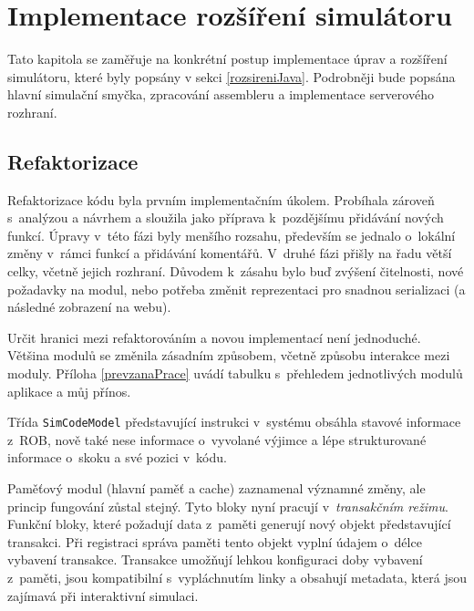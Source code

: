 
\chapter{Implementace rozšíření simulátoru}
\label{Implementacerozs}

Tato kapitola se zaměřuje na konkrétní postup implementace úprav a rozšíření simulátoru, které byly popsány v sekci \ref{rozsireniJava}.
Podrobněji bude popsána hlavní simulační smyčka, zpracování assembleru a implementace serverového rozhraní.

\section{Refaktorizace}

Refaktorizace kódu byla prvním implementačním úkolem.
Probíhala zároveň s~analýzou a návrhem a sloužila jako příprava k~pozdějšímu přidávání nových funkcí.
Úpravy v~této fázi byly menšího rozsahu, především se jednalo o~lokální změny v~rámci funkcí a přidávání komentářů.
V~druhé fázi přišly na řadu větší celky, včetně jejich rozhraní.
Důvodem k~zásahu bylo buď zvýšení čitelnosti, nové požadavky na modul, nebo potřeba změnit reprezentaci pro snadnou serializaci (a následné zobrazení na webu).

Určit hranici mezi refaktorováním a novou implementací není jednoduché.
Většina modulů se změnila zásadním způsobem, včetně způsobu interakce mezi moduly.
Příloha \ref{prevzanaPrace} uvádí tabulku s~přehledem jednotlivých modulů aplikace a můj přínos.

Třída \texttt{SimCodeModel} představující instrukci v~systému obsáhla stavové informace z~ROB, nově také nese informace o~vyvolané výjimce a lépe strukturované informace o~skoku a své pozici v~kódu.

Paměťový modul (hlavní paměť a cache) zaznamenal významné změny, ale princip fungování zůstal stejný.
Tyto bloky nyní pracují v~\emph{transakčním režimu}.
Funkční bloky, které požadují data z~paměti generují nový objekt představující transakci.
Při registraci správa paměti tento objekt vyplní údajem o~délce vybavení transakce.
Transakce umožňují lehkou konfiguraci doby vybavení z~paměti, jsou kompatibilní s~vypláchnutím linky a obsahují metadata, která jsou zajímavá při interaktivní simulaci.

